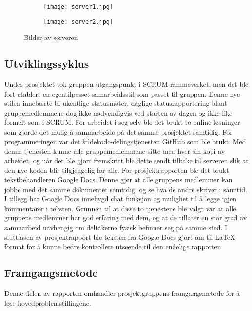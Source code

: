 \documentclass[../main.tex]{subfiles}
\begin{document}
\begin{figure}[h!]
        \centering
        \begin{subfigure}[b]{7cm}
                \centering
                \texttt{[image: server1.jpg]}

        \end{subfigure}
        \begin{subfigure}[b]{7cm}
                \centering
                \texttt{[image: server2.jpg]}

        \end{subfigure}
        \caption{Bilder av serveren}
\end{figure}

\subsection{Utviklingssyklus}
Under prosjektet tok gruppen utgangspunkt i SCRUM rammeverket, men det ble fort etablert en egentilpasset samarbeidsstil som passet til gruppen. Denne nye stilen innebærte bi-ukentlige statusmøter, daglige statusrapportering blant gruppemedlemmene dog ikke nødvendigvis ved starten av dagen og ikke like formelt som i SCRUM.\newline
\newline
For arbeidet i seg selv ble det brukt to online løsninger som gjorde det mulig å sammarbeide på det samme prosjektet samtidig. For programmeringen var det kildekode-delingstjenesten GitHub som ble brukt. Med denne tjenesten kunne alle gruppemedlemmene sitte med hver sin kopi av arbeidet, og når det ble gjort fremskritt ble dette sendt tilbake til serveren slik at den nye koden blir tilgjengelig for alle. \newline
For prosjektrapporten ble det brukt tekstbehandleren Google Docs. Denne gjør at alle gruppens medlemmer kan jobbe med det samme dokumentet samtidig, og se hva de andre skriver i sanntid. I tillegg har Google Docs innebygd chat funksjon og mulighet til å legge igjen kommentarer i teksten. Grunnen til at disse to tjenestene ble valgt var at alle gruppens medlemmer har god erfaring med dem, og at de tillater en stor grad av sammarbeid uavhengig om deltakerne fysisk befinner seg på samme sted. I sluttfasen av prosjektrapport ble teksten fra Google Docs gjort om til LaTeX format for å kunne bedre kontrollere utseende til den endelige rapporten.

\subsection{Framgangsmetode}
Denne delen av rapporten omhandler prosjektgruppens framgangsmetode for å løse hovedproblemstillingene.
\end{document}
